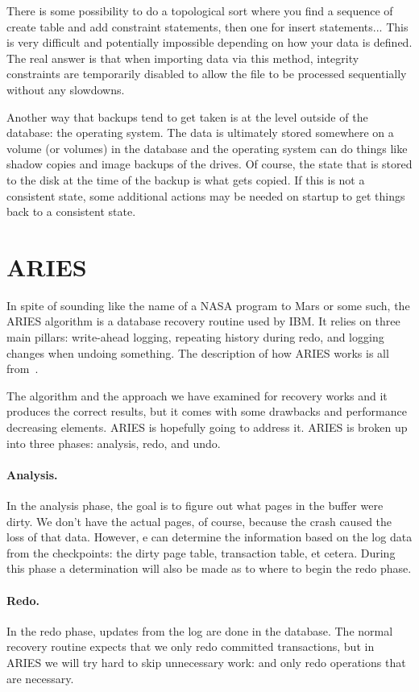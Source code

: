 There is some possibility to do a topological sort where you find a sequence of create table and add constraint statements, then one for insert statements... This is very difficult and potentially impossible depending on how your data is defined. The real answer is that when importing data via this method, integrity constraints are temporarily disabled to allow the file to be processed sequentially without any slowdowns.

Another way that backups tend to get taken is at the level outside of the database: the operating system. The data is ultimately stored somewhere on a volume (or volumes) in the database and the operating system can do things like shadow copies and image backups of the drives. Of course, the state that is stored to the disk at the time of the backup is what gets copied. If this is not a consistent state, some additional actions may be needed on startup to get things back to a consistent state.

\section*{ARIES}
In spite of sounding like the name of a NASA program to Mars or some such, the ARIES algorithm is a database recovery routine used by IBM. It relies on three main pillars: write-ahead logging, repeating history during redo, and logging changes when undoing something. The description of how ARIES works is all from~\cite{fds}.

The algorithm and the approach we have examined for recovery works and it produces the correct results, but it comes with some drawbacks and performance decreasing elements. ARIES is hopefully going to address it. ARIES is broken up into three phases: analysis, redo, and undo.

\paragraph{Analysis.} In the analysis phase, the goal is to figure out what pages in the buffer were dirty. We don't have the actual pages, of course, because the crash caused the loss of that data. However, e can determine the information based on the log data from the checkpoints: the dirty page table, transaction table, et cetera. During this phase a determination will also be made as to where to begin the redo phase.

\paragraph{Redo.} In the redo phase, updates from the log are done in the database. The normal recovery routine expects that we only redo committed transactions, but in ARIES we will try hard to skip unnecessary work: and only redo operations that are necessary.

